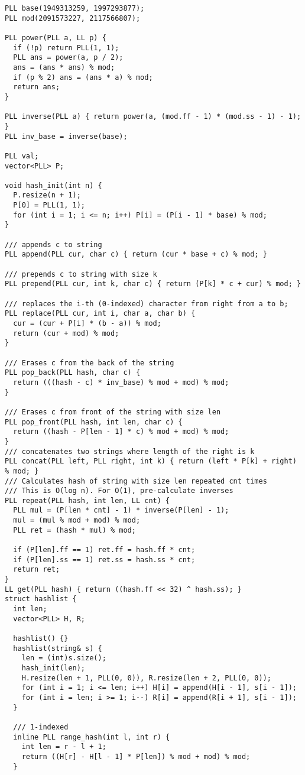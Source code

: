 \documentclass[FSZ,a4paper,onesided]{article}
\begin{document}
\begin{multicols*}{\COLS}
\begin{lstlisting}
PLL base(1949313259, 1997293877);
PLL mod(2091573227, 2117566807);

PLL power(PLL a, LL p) {
  if (!p) return PLL(1, 1);
  PLL ans = power(a, p / 2);
  ans = (ans * ans) % mod;
  if (p % 2) ans = (ans * a) % mod;
  return ans;
}

PLL inverse(PLL a) { return power(a, (mod.ff - 1) * (mod.ss - 1) - 1); }
PLL inv_base = inverse(base);

PLL val;
vector<PLL> P;

void hash_init(int n) {
  P.resize(n + 1);
  P[0] = PLL(1, 1);
  for (int i = 1; i <= n; i++) P[i] = (P[i - 1] * base) % mod;
}

/// appends c to string
PLL append(PLL cur, char c) { return (cur * base + c) % mod; }

/// prepends c to string with size k
PLL prepend(PLL cur, int k, char c) { return (P[k] * c + cur) % mod; }

/// replaces the i-th (0-indexed) character from right from a to b;
PLL replace(PLL cur, int i, char a, char b) {
  cur = (cur + P[i] * (b - a)) % mod;
  return (cur + mod) % mod;
}

/// Erases c from the back of the string
PLL pop_back(PLL hash, char c) {
  return (((hash - c) * inv_base) % mod + mod) % mod;
}

/// Erases c from front of the string with size len
PLL pop_front(PLL hash, int len, char c) {
  return ((hash - P[len - 1] * c) % mod + mod) % mod;
}
/// concatenates two strings where length of the right is k
PLL concat(PLL left, PLL right, int k) { return (left * P[k] + right) % mod; }
/// Calculates hash of string with size len repeated cnt times
/// This is O(log n). For O(1), pre-calculate inverses
PLL repeat(PLL hash, int len, LL cnt) {
  PLL mul = (P[len * cnt] - 1) * inverse(P[len] - 1);
  mul = (mul % mod + mod) % mod;
  PLL ret = (hash * mul) % mod;

  if (P[len].ff == 1) ret.ff = hash.ff * cnt;
  if (P[len].ss == 1) ret.ss = hash.ss * cnt;
  return ret;
}
LL get(PLL hash) { return ((hash.ff << 32) ^ hash.ss); }
struct hashlist {
  int len;
  vector<PLL> H, R;

  hashlist() {}
  hashlist(string& s) {
    len = (int)s.size();
    hash_init(len);
    H.resize(len + 1, PLL(0, 0)), R.resize(len + 2, PLL(0, 0));
    for (int i = 1; i <= len; i++) H[i] = append(H[i - 1], s[i - 1]);
    for (int i = len; i >= 1; i--) R[i] = append(R[i + 1], s[i - 1]);
  }

  /// 1-indexed
  inline PLL range_hash(int l, int r) {
    int len = r - l + 1;
    return ((H[r] - H[l - 1] * P[len]) % mod + mod) % mod;
  }


\end{lstlisting}
\end{multicols*}
\end{document}

